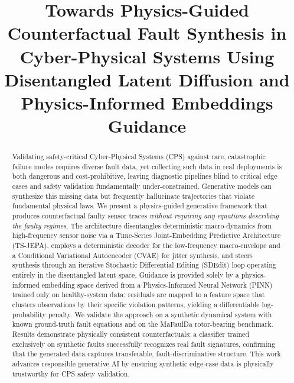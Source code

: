 \documentclass[conference]{IEEEtran}
\begin{document}
\title{Towards Physics-Guided Counterfactual Fault Synthesis in
Cyber-Physical Systems Using Disentangled Latent Diffusion and
Physics-Informed Embeddings Guidance}

\author{%
}

\maketitle

\begin{abstract}
Validating safety-critical Cyber-Physical Systems (CPS) against rare, catastrophic failure modes requires diverse fault data, yet collecting such data in real deployments is both dangerous and cost-prohibitive, leaving diagnostic pipelines blind to critical edge cases and safety validation fundamentally under-constrained. Generative models can synthesize this missing data but frequently hallucinate trajectories that violate fundamental physical laws. We present a physics-guided generative framework that produces counterfactual faulty sensor traces \emph{without requiring any equations describing the faulty regimes}. The architecture disentangles deterministic macro-dynamics from high-frequency sensor noise via a Time-Series Joint-Embedding Predictive Architecture (TS-JEPA), employs a deterministic decoder for the low-frequency macro-envelope and a Conditional Variational Autoencoder (CVAE) for jitter synthesis, and steers synthesis through an iterative Stochastic Differential Editing (SDEdit) loop operating entirely in the disentangled latent space. Guidance is provided solely by a physics-informed embedding space derived from a Physics-Informed Neural Network (PINN) trained only on healthy-system data; residuals are mapped to a feature space that clusters observations by their specific violation patterns, yielding a differentiable log-probability penalty. We validate the approach on a synthetic dynamical system with known ground-truth fault equations and on the MaFaulDa rotor-bearing benchmark. Results demonstrate physically consistent counterfactuals: a classifier trained exclusively on synthetic faults successfully recognizes real fault signatures, confirming that the generated data captures transferable, fault-discriminative structure. This work advances responsible generative AI by ensuring synthetic edge-case data is physically trustworthy for CPS safety validation.
\end{abstract}
\end{document}
